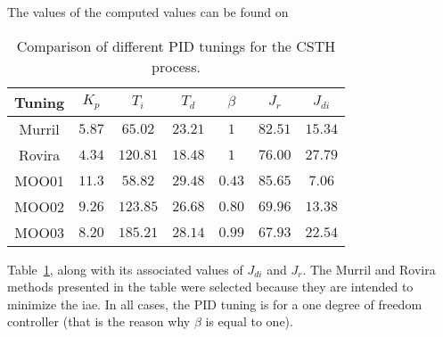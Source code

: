 The values of the computed values can be found on %
\begin{table}[tb]
	\centering
	\caption{Comparison of different PID tunings for the CSTH process.}
	\setlength{\tabcolsep}{8pt}
	\begin{tabular}{ccccccc}
		\toprule
		Tuning 	& $K_p$ 	& $T_i$		& $T_d$		& $\beta$	& $J_{r}$	& $J_{di}$\\
		\midrule
		Murril	& $5.87$	& $65.02$	& $23.21$	& $1$			& $82.51$	& $15.34$\\
		Rovira	& $4.34$	& $120.81$	& $18.48$	& $1$			& $76.00$	& $27.79$\\
		MOO01	& $11.3$	& $58.82$	& $29.48$	& $0.43$		& $85.65$	& $7.06$\\
		MOO02	& $9.26$	& $123.85$	& $26.68$	& $0.80$		& $69.96$	& $13.38$\\
		MOO03	& $8.20$	& $185.21$	& $28.14$	& $0.99$		& $67.93$	& $22.54$\\
		\bottomrule
	\end{tabular}
	\label{tab:CompPIDCSTH}
\end{table}
%
Table~\ref{tab:CompPIDCSTH}, along with its associated values of $J_{di}$ and $J_r$. The Murril and Rovira methods presented in the table were selected because they are intended to minimize the \gls{iae}. In all cases, the PID tuning is for a one degree of freedom controller (that is  the reason why $\beta$ is equal to one).

